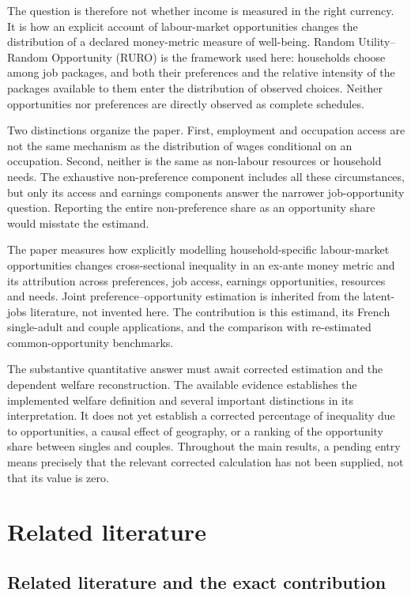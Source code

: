\documentclass[11pt,a4paper]{article}
\begin{document}
The question is therefore not whether income is measured in the right currency. It is how an explicit account of labour-market opportunities changes the distribution of a declared money-metric measure of well-being. Random Utility--Random Opportunity (RURO) is the framework used here: households choose among job packages, and both their preferences and the relative intensity of the packages available to them enter the distribution of observed choices. Neither opportunities nor preferences are directly observed as complete schedules.

Two distinctions organize the paper. First, employment and occupation access are not the same mechanism as the distribution of wages conditional on an occupation. Second, neither is the same as non-labour resources or household needs. The exhaustive non-preference component includes all these circumstances, but only its access and earnings components answer the narrower job-opportunity question. Reporting the entire non-preference share as an opportunity share would misstate the estimand.

The paper measures how explicitly modelling household-specific labour-market opportunities changes cross-sectional inequality in an ex-ante money metric and its attribution across preferences, job access, earnings opportunities, resources and needs. Joint preference--opportunity estimation is inherited from the latent-jobs literature, not invented here. The contribution is this estimand, its French single-adult and couple applications, and the comparison with re-estimated common-opportunity benchmarks.

The substantive quantitative answer must await corrected estimation and the dependent welfare reconstruction. The available evidence establishes the implemented welfare definition and several important distinctions in its interpretation. It does not yet establish a corrected percentage of inequality due to opportunities, a causal effect of geography, or a ranking of the opportunity share between singles and couples. Throughout the main results, a pending entry means precisely that the relevant corrected calculation has not been supplied, not that its value is zero.

\section{Related literature}\label{related-literature}

\subsection{Related literature and the exact contribution}\label{related-literature-and-the-exact-contribution}
\end{document}
